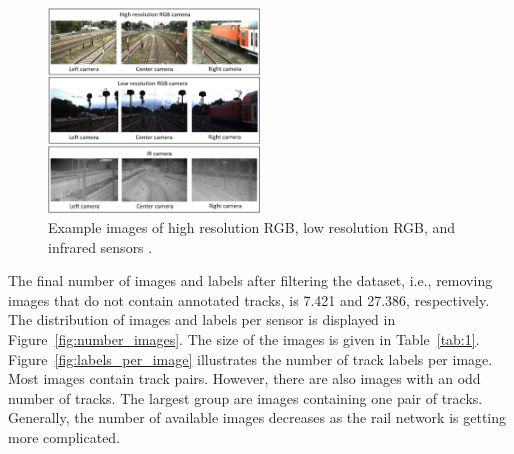 \documentclass[Master,MDS,english]{BASE/twbook} %
\begin{document}
\begin{figure}[H]
\centering
\includegraphics[width=0.5\textwidth]{images/datasets/db/2024-01-29 19_50_46-2305.03001}
\caption{Example images of high resolution RGB, low resolution RGB, and infrared sensors \citep{tagiew2023osdar23}. }
\label{fig:sensor_image}
\end{figure}


The final number of images and labels after filtering the dataset, i.e., removing images that do not contain annotated tracks, is 7.421 and 27.386, respectively. The distribution of images and labels per sensor is displayed in Figure~\ref{fig:number_images}. The size of the images is given in Table~\ref{tab:1}. Figure~\ref{fig:labels_per_image} illustrates the number of track labels per image. Most images contain track pairs. However, there are also images with an odd number of tracks. The largest group are images containing one pair of tracks. Generally, the number of available images decreases as the rail network is getting more complicated.
\end{document}
